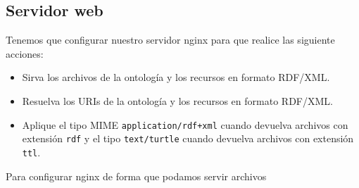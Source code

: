 \subsection{Servidor web}

Tenemos que configurar nuestro servidor {\sf nginx} para que realice las siguiente acciones:

\begin{itemize}
	\item Sirva los archivos de la ontología y los recursos en formato {\sf RDF/XML}.
	\item Resuelva los {\sf URIs} de la ontología y los recursos en formato {\sf RDF/XML}.
	\item Aplique el tipo {\sf MIME} {\tt application/rdf+xml} cuando devuelva archivos con extensión {\tt rdf} y el tipo {\tt text/turtle} cuando devuelva archivos con extensión {\tt ttl}.
\end{itemize}

Para configurar nginx de forma que podamos servir archivos 

